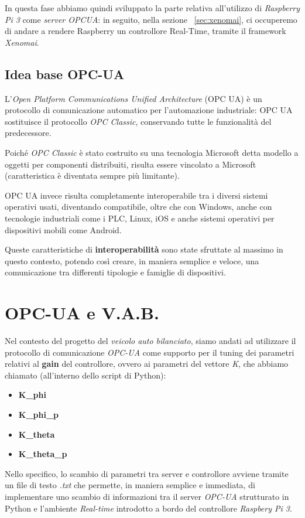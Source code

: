 In questa fase abbiamo quindi sviluppato la parte relativa all'utilizzo di \textit{Raspberry Pi 3} come \textit{server OPCUA}: in seguito, nella sezione ~\ref{sec:xenomai}, ci occuperemo di andare a rendere Raspberry un controllore Real-Time, tramite il framework \textit{Xenomai}.

\subsection{Idea base OPC-UA}
L'\textit{Open Platform Communications Unified Architecture} (OPC UA) è un protocollo di comunicazione automatico per l'automazione industriale: OPC UA sostituisce il protocollo \textit{OPC Classic}, conservando tutte le funzionalità del predecessore.

Poiché \textit{OPC Classic} è stato costruito su una tecnologia Microsoft detta modello a oggetti per componenti distribuiti, risulta essere vincolato a Microsoft (caratteristica è diventata sempre più limitante).

OPC UA invece risulta completamente interoperabile tra i diversi sistemi operativi usati, diventando compatibile, oltre che con Windows, anche con tecnologie industriali come i PLC, Linux, iOS e anche sistemi operativi per dispositivi mobili come Android.

Queste caratteristiche di \textbf{interoperabilità} sono state sfruttate al massimo in questo contesto, potendo così creare, in maniera semplice e veloce, una comunicazione tra differenti tipologie e famiglie di dispositivi.

\newpage
\section{OPC-UA e V.A.B.}
Nel contesto del progetto del \textit{veicolo auto bilanciato}, siamo andati ad utilizzare il protocollo di comunicazione \textit{OPC-UA} come supporto per il tuning dei parametri relativi al \textbf{gain} del controllore, ovvero ai parametri del vettore \textit{K}, che abbiamo chiamato (all'interno dello script di Python):
\begin{itemize}
	\item \textbf{K\_phi}
	\item \textbf{K\_phi\_p}
	\item \textbf{K\_theta}
	\item \textbf{K\_theta\_p}
\end{itemize}

Nello specifico, lo scambio di parametri tra server e controllore avviene tramite un file di testo \textit{.txt} che permette, in maniera semplice e immediata, di implementare uno scambio di informazioni tra il server \textit{OPC-UA} strutturato in Python e l'ambiente \textit{Real-time} introdotto a bordo del controllore \textit{Raspbery Pi 3}.


